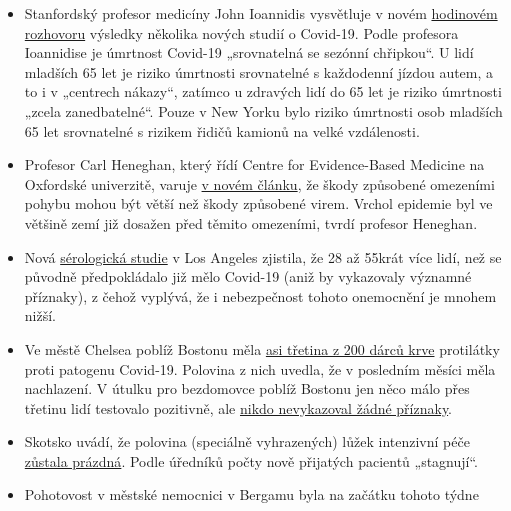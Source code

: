\begin{itemize}
\tightlist
\item
  Stanfordský profesor medicíny John Ioannidis vysvětluje v novém
  \href{https://www.youtube.com/watch?v=cwPqmLoZA4s}{hodinovém
  rozhovoru} výsledky několika nových studií o Covid-19. Podle profesora
  Ioannidise je úmrtnost Covid-19 „srovnatelná se sezónní chřipkou``. U
  lidí mladších 65 let je riziko úmrtnosti srovnatelné s každodenní
  jízdou autem, a to i v „centrech nákazy``, zatímco u zdravých lidí do
  65 let je riziko úmrtnosti „zcela zanedbatelné``. Pouze v New Yorku
  bylo riziko úmrtnosti osob mladších 65 let srovnatelné s rizikem
  řidičů kamionů na velké vzdálenosti.
\item
  Profesor Carl Heneghan, který řídí Centre for Evidence-Based Medicine
  na Oxfordské univerzitě, varuje
  \href{https://news.yahoo.com/lockdown-damage-outweighs-coronavirus-warning-121940675.html}{v
  novém článku}, že škody způsobené omezeními pohybu mohou být větší než
  škody způsobené virem. Vrchol epidemie byl ve většině zemí již dosažen
  před těmito omezeními, tvrdí profesor Heneghan.
\item
  Nová
  \href{http://publichealth.lacounty.gov/phcommon/public/media/mediapubhpdetail.cfm?prid=2328}{sérologická
  studie} v Los Angeles zjistila, že 28 až 55krát více lidí, než se
  původně předpokládalo již mělo Covid-19 (aniž by vykazovaly významné
  příznaky), z čehož vyplývá, že i nebezpečnost tohoto onemocnění je
  mnohem nižší.
\item
  Ve městě Chelsea poblíž Bostonu měla
  \href{https://archive.is/20200418222442/https:/www.bostonglobe.com/2020/04/17/business/nearly-third-200-blood-samples-taken-chelsea-show-exposure-coronavirus/}{asi
  třetina z 200 dárců krve} protilátky proti patogenu Covid-19. Polovina
  z nich uvedla, že v posledním měsíci měla nachlazení. V útulku pro
  bezdomovce poblíž Bostonu jen něco málo přes třetinu lidí testovalo
  pozitivně, ale
  \href{https://www.wsbtv.com/news/trending/coronavirus-cdc-reviewing-stunning-universal-testing-results-boston-homeless-shelter/ZADQ45HCAZEVJAZA3OTCUR7M6M/}{nikdo
  nevykazoval žádné příznaky}.
\item
  Skotsko uvádí, že polovina (speciálně vyhrazených) lůžek intenzivní
  péče
  \href{https://www.heraldscotland.com/news/18377095.coronavirus-scotland-half-icu-beds-empty/}{zůstala
  prázdná}. Podle úředníků počty nově přijatých pacientů „stagnují``.
\item
  Pohotovost v městské nemocnici v Bergamu byla na začátku tohoto týdne

\end{itemize}
